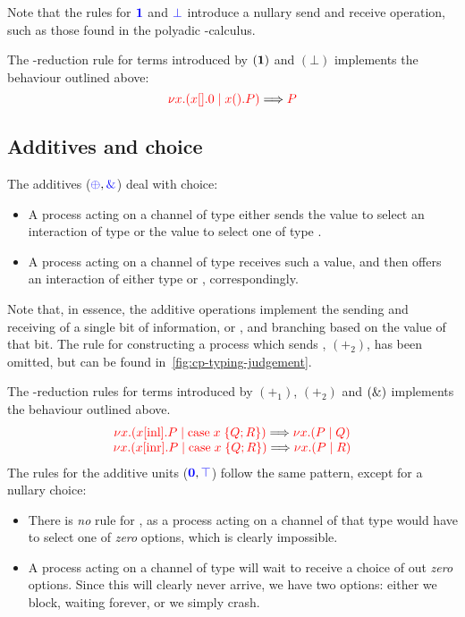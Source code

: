 Note that the rules for $\textcolor{blue}{\mathbf{1}}$ and $\textcolor{blue}{\bot}$ introduce a nullary send and
receive operation, such as those found in the polyadic \textpi-calculus.
\begin{center}
  \cpInfOne
  \cpInfBot
\end{center}
The \textbeta-reduction rule for terms introduced by $(\mathbf{1})$ and $(\bot)$
implements the behaviour outlined above:
\[
  \textcolor{red}{\nu x.(x[].0 \mid x().P)}
  \Longrightarrow
  \textcolor{red}{P}
\]

\subsection{Additives and choice}\label{sec:cp-choice}
The additives ($\textcolor{blue}{\oplus}, \textcolor{blue}{\mathbin{\text{\&}}}$) deal with choice:
\begin{itemize}
\item
  A process acting on a channel of type  either sends the value
   to select an interaction of type  or the value  to
  select one of type .
\item
  A process acting on a channel of type  receives such a value,
  and then offers an interaction of either type  or ,
  correspondingly.
\end{itemize}
Note that, in essence, the additive operations implement the sending and
receiving of a single bit of information,  or , and branching
based on the value of that bit.
The rule for constructing a process which sends , $(\plus_2)$, has been
omitted, but can be found in~\cref{fig:cp-typing-judgement}.
\begin{center}
  \cpInfWith
\end{center}
The \textbeta-reduction rules for terms introduced by $(\plus_1)$, $(\plus_2)$
and $(\mathbin{\text{\&}})$ implements the behaviour outlined above.
\[
  \begin{array}{c}
    \textcolor{red}{\nu x.(x[\text{inl}].P \mid \text{case}\;x\;\{Q;R\})} \Longrightarrow \textcolor{red}{\nu x.(P \mid Q)}
    \\
    \textcolor{red}{\nu x.(x[\text{inr}].P \mid \text{case}\;x\;\{Q;R\})} \Longrightarrow \textcolor{red}{\nu x.(P \mid R)}
  \end{array}
\]
%
The rules for the additive units ($\textcolor{blue}{\mathbf{0}}, \textcolor{blue}{\top}$) follow the same
pattern, except for a nullary choice:
\begin{itemize}
\item
  There is \emph{no} rule for \ty{\nil}, as a process acting on a channel of
  that type would have to select one of \emph{zero} options, which is clearly
  impossible.
\item
  A process acting on a channel of type \ty{\top} will wait to receive a choice
  of out \emph{zero} options. Since this will clearly never arrive, we have two
  options: either we block, waiting forever, or we simply crash.
\end{itemize}
